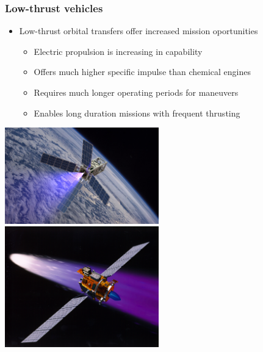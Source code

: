 \begin{frame} %
\frametitle{Low-thrust vehicles} %
\begin{itemize}
    \item Low-thrust orbital transfers offer increased mission oportunities
    \begin{itemize}
        \item Electric propulsion is increasing in capability
        \item Offers much higher specific impulse than chemical engines 
        \item Requires much longer operating periods for maneuvers 
        \item Enables long duration missions with frequent thrusting
    \end{itemize}
\end{itemize}

\begin{center}
    \includegraphics[width=0.5\textwidth,height=0.5\textheight,keepaspectratio]{figures/2016AAS/patriot_plume.jpg}
    ~
    \includegraphics[width=0.5\textwidth,height=0.5\textheight,keepaspectratio]{figures/2016AAS/deepspace1.jpg}
\end{center}
\end{frame}   %

